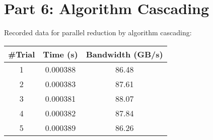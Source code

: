 \section{Part 6: Algorithm Cascading}
\label{sec:part6}

Recorded data for parallel reduction by algorithm cascading:

\begin{center}
	\begin{tabular}{||c c c||} 
		\hline
		\#Trial & Time (s) & Bandwidth (GB/s) \\ [0.5ex] 
		\hline\hline
		1 & 0.000388 & 86.48 \\ 
		\hline
		2 & 0.000383 & 87.61 \\
		\hline
		3 & 0.000381 & 88.07 \\
		\hline
		4 & 0.000382 & 87.84 \\
		\hline
		5 & 0.000389 & 86.26 \\
		\hline
	\end{tabular}
\end{center}